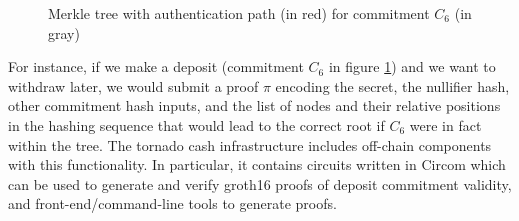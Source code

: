 \begin{figure}[ht]
\centering
{}
    \caption{Merkle tree with authentication path (in red) for commitment $C_6$ (in gray)}
\label{fig:merkle-tree}
\end{figure}

\noindent For instance, if we make a deposit (commitment $C_6$ in figure \ref{fig:merkle-tree}) and we want to withdraw later, we would submit a proof $\pi$ encoding the secret, the nullifier hash, other commitment hash inputs, and the list of nodes and their relative positions in the hashing sequence that would lead to the correct root if $C_6$ were in fact within the tree. The tornado cash infrastructure includes off-chain components with this functionality. In particular, it contains circuits written in Circom which can be used to generate and verify groth16 proofs of deposit commitment validity, and front-end/command-line tools to generate proofs.

